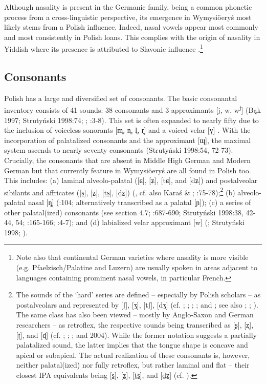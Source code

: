 \documentclass[output=paper]{langscibook}
\begin{document}
Although nasality is present in the Germanic family, being a common phonetic process from a cross-linguistic perspective, its emergence in Wymysiöeryś most likely stems from a Polish influence. Indeed, nasal vowels appear most commonly and most consistently in Polish loans. This complies with the origin of nasality in Yiddish where its presence is attributed to Slavonic influence \citep[583-585]{Weinreich2008}.\footnote{Note also that continental German varieties where nasality is more visible (e.g. Pfaelzisch/Palatine and Luzern) are usually spoken in areas adjacent to languages containing prominent nasal vowels, in particular French.}

\subsection{Consonants}\label{sec:wymsorys:4.4}

Polish has a large and diversified set of consonants. The basic consonantal inventory consists of 41 sounds: 38 consonants and 3 approximants [j, w, w\textsuperscript{j}] (Bąk 1997; Strutyński 1998:74; \citealt{Jassem2003}; \citealt{Gussmann2007}:3-8). This set is often expanded to nearly fifty due to the inclusion of voiceless sonorants [m̥, n̥, l̥, r̥] and a voiced velar [ɣ] \citep[4]{Gussmann2007}. With the incorporation of palatalized consonants and the approximant [ɰ], the maximal system ascends to nearly seventy consonants (Strutyński 1998:54, 72-73). Crucially, the consonants that are absent in Middle High German and Modern German but that currently feature in Wymysiöeryś are all found in Polish too. This includes: (a) laminal alveolo-palatal ([ɕ], [ʑ], [tɕ], and [dʑ]) and postalveolar sibilants and affricates ([s̠], [z̠], [ṯs̠], [ḏz̠]) (\citealt{Hamann2003,20042003}, cf. also Karaś \& \citealt{Madejowa1977}; \citealt{Gussmann2007}:75-78);\footnote{The sounds of the ‘hard’ series are defined – especially by Polish scholars – as postalveolars and represented by [ʃ], [ʒ], [tʃ], [dʒ] (cf. \citealt{Biedrzycki1974}; \citealt{Spencer1986}; \citealt{Dogil1990}; \citealt{Jassem2003}; and \citealt{Gussmann2007}; see also \citealt{Stieber1962}; \citealt{Rospond1971}; \citealt{Wierzchowska1980}). The same class has also been viewed – mostly by Anglo-Saxon and German researchers – as retroflex, the respective sounds being transcribed as [ʂ], [ʐ], [ʈ], and [ɖ] (cf. \citealt{Keating1991}; \citealt{LadefogedMaddieson1996}; \citealt{PadgettZygis2003}; \citealt{Hamann2003} and 2004). While the former notation suggests a partially palatalized sound, the latter implies that the tongue shape is concave and apical or subapical. The actual realization of these consonants is, however, neither palatal(ized) nor fully retroflex, but rather laminal and flat – their closest IPA equivalents being [s̠], [z̠], [ṯs̠], and [ḏz̠] (cf. \citealt{Hamann2003}).} (b) alveolo-palatal nasal [ȵ] (\citealt{Jassem2003}:104; alternatively transcribed as a palatal [ɲ]); (c) a series of other palatal(ized) consonants (see section 4.7; \citealt{Rothstein1993}:687-690; Strutyński 1998:38, 42-44, 54; \citealt{SussexCubberley2006}:165-166; \citealt{Gussmann2007}:4-7); and (d) labialized velar approximant [w] (\citealt{Jassem2003}; Strutyński 1998; \citealt{Gussmann2007}).
\end{document}
